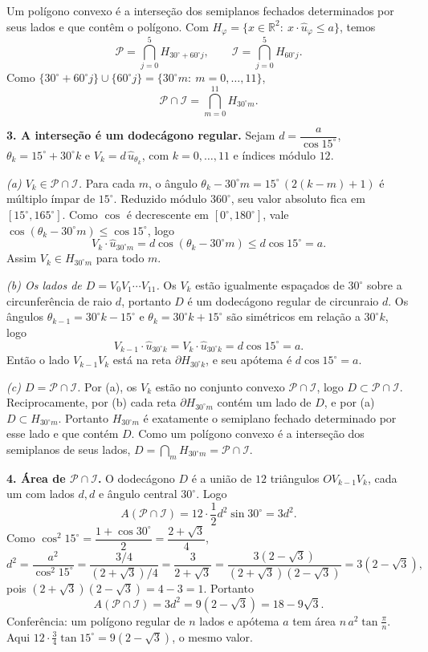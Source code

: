 \documentclass{article}%
\begin{document}
Um polígono convexo é a interseção dos semiplanos fechados determinados por seus lados e que contêm o polígono. Com $H_\varphi=\{x\in\mathbb R^2:\ x\cdot\hat u_\varphi\le a\}$, temos
\[
\mathcal P=\bigcap_{j=0}^{5}H_{30^\circ+60^\circ j},\qquad \mathcal I=\bigcap_{j=0}^{5}H_{60^\circ j}.
\]
Como $\{30^\circ+60^\circ j\}\cup\{60^\circ j\}=\{30^\circ m:\ m=0,\ldots,11\}$,
\[
\mathcal P\cap\mathcal I=\bigcap_{m=0}^{11}H_{30^\circ m}.
\]

\textbf{3. A interseção é um dodecágono regular.} Sejam $d=\dfrac{a}{\cos 15^\circ}$, $\theta_k=15^\circ+30^\circ k$ e $V_k=d\,\hat u_{\theta_k}$, com $k=0,\ldots,11$ e índices módulo $12$.

\emph{(a) $V_k\in\mathcal P\cap\mathcal I$.} Para cada $m$, o ângulo $\theta_k-30^\circ m=15^\circ\,(2(k-m)+1)$ é múltiplo ímpar de $15^\circ$. Reduzido módulo $360^\circ$, seu valor absoluto fica em $[15^\circ,165^\circ]$. Como $\cos$ é decrescente em $[0^\circ,180^\circ]$, vale $\cos(\theta_k-30^\circ m)\le\cos 15^\circ$, logo
\[
V_k\cdot\hat u_{30^\circ m}=d\cos(\theta_k-30^\circ m)\le d\cos15^\circ=a.
\]
Assim $V_k\in H_{30^\circ m}$ para todo $m$.

\emph{(b) Os lados de $D=V_0V_1\cdots V_{11}$.} Os $V_k$ estão igualmente espaçados de $30^\circ$ sobre a circunferência de raio $d$, portanto $D$ é um dodecágono regular de circunraio $d$. Os ângulos $\theta_{k-1}=30^\circ k-15^\circ$ e $\theta_k=30^\circ k+15^\circ$ são simétricos em relação a $30^\circ k$, logo
\[
V_{k-1}\cdot\hat u_{30^\circ k}=V_k\cdot\hat u_{30^\circ k}=d\cos15^\circ=a.
\]
Então o lado $V_{k-1}V_k$ está na reta $\partial H_{30^\circ k}$, e seu apótema é $d\cos15^\circ=a$.

\emph{(c) $D=\mathcal P\cap\mathcal I$.} Por (a), os $V_k$ estão no conjunto convexo $\mathcal P\cap\mathcal I$, logo $D\subset\mathcal P\cap\mathcal I$. Reciprocamente, por (b) cada reta $\partial H_{30^\circ m}$ contém um lado de $D$, e por (a) $D\subset H_{30^\circ m}$. Portanto $H_{30^\circ m}$ é exatamente o semiplano fechado determinado por esse lado e que contém $D$. Como um polígono convexo é a interseção dos semiplanos de seus lados, $D=\bigcap_m H_{30^\circ m}=\mathcal P\cap\mathcal I$.

\textbf{4. Área de $\mathcal P\cap\mathcal I$.} O dodecágono $D$ é a união de $12$ triângulos $OV_{k-1}V_k$, cada um com lados $d,d$ e ângulo central $30^\circ$. Logo
\[
A(\mathcal P\cap\mathcal I)=12\cdot\frac12 d^2\sin30^\circ=3d^2.
\]
Como $\cos^2 15^\circ=\dfrac{1+\cos30^\circ}{2}=\dfrac{2+\sqrt3}{4}$,
\[
d^2=\frac{a^2}{\cos^2 15^\circ}=\frac{3/4}{(2+\sqrt3)/4}=\frac{3}{2+\sqrt3}=\frac{3(2-\sqrt3)}{(2+\sqrt3)(2-\sqrt3)}=3(2-\sqrt3),
\]
pois $(2+\sqrt3)(2-\sqrt3)=4-3=1$. Portanto
\[
A(\mathcal P\cap\mathcal I)=3d^2=9(2-\sqrt3)=18-9\sqrt3.
\]
Conferência: um polígono regular de $n$ lados e apótema $a$ tem área $n\,a^2\tan\frac{\pi}{n}$. Aqui $12\cdot\frac34\tan15^\circ=9(2-\sqrt3)$, o mesmo valor.
\end{document}
